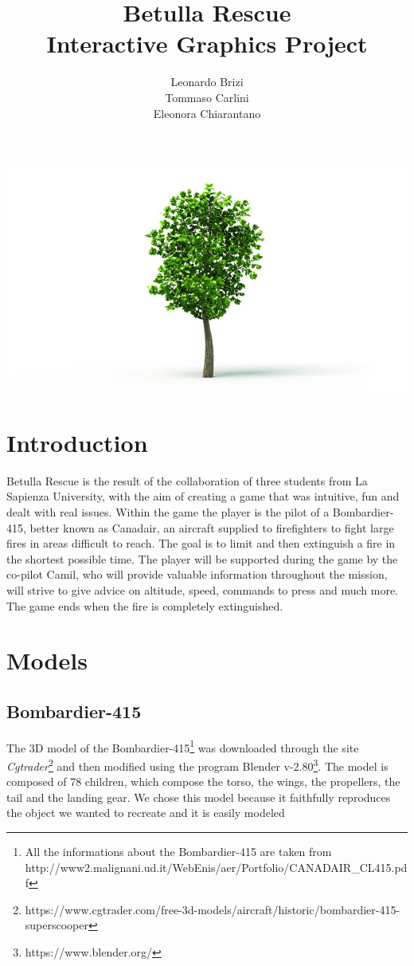 \documentclass{article}
\title{Betulla Rescue \\ Interactive Graphics Project}
\author{Leonardo Brizi\\Tommaso Carlini\\Eleonora Chiarantano}
\begin{document}
\maketitle

\includegraphics[width=\linewidth]{immag.png}

\newpage

\section*{Introduction}
Betulla Rescue is the result of the collaboration of three students from La Sapienza University, with the aim of creating a game that was intuitive, fun and dealt with real issues. Within the game the player is the pilot of a Bombardier-415, better known as Canadair, an aircraft supplied to firefighters to fight large fires in areas difficult to reach. The goal is to limit and then extinguish a fire in the shortest possible time. The player will be supported during the game by the co-pilot Camil, who will provide valuable information throughout the mission, will strive to give advice on altitude, speed, commands to press and much more. The game ends when the fire is completely extinguished.

\section*{Models}

\subsection*{Bombardier-415}
The 3D model of the Bombardier-415\footnote{All the informations about the Bombardier-415 are taken from http://www2.malignani.ud.it/WebEnis/aer/Portfolio/CANADAIR\_CL415.pdf} was downloaded through the site \textit{Cgtrader}\footnote{https://www.cgtrader.com/free-3d-models/aircraft/historic/bombardier-415-superscooper} and then modified using the program Blender v-2.80\footnote{https://www.blender.org/}. The model is composed of 78 children, which compose the torso, the wings, the propellers, the tail and the landing gear. We chose this model because it faithfully reproduces the object we wanted to recreate and it is easily modeled
\end{document}
